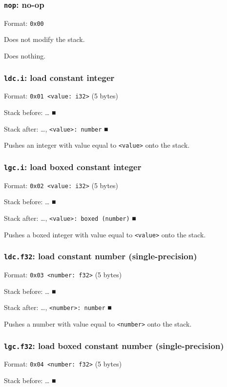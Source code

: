 \documentclass[11pt]{article}
\begin{document}
\subsubsection{\texttt{nop}: no-op}
\label{sec:orgbc7ec8d}
Format: \texttt{0x00}

Does not modify the stack.

Does nothing.

\subsubsection{\texttt{ldc.i}: load constant integer}
\label{sec:orgc756866}
Format: \texttt{0x01 <value: i32>} (5 bytes)

Stack before: \ldots{}​ ■

Stack after: \ldots{}​, \texttt{<value>: number} ■

Pushes an integer with value equal to \texttt{<value>} onto the stack.

\subsubsection{\texttt{lgc.i}: load boxed constant integer}
\label{sec:org5cf9345}
Format: \texttt{0x02 <value: i32>} (5 bytes)

Stack before: \ldots{}​ ■

Stack after: \ldots{}​, \texttt{<value>: boxed (number)} ■

Pushes a boxed integer with value equal to \texttt{<value>} onto the stack.

\subsubsection{\texttt{ldc.f32}: load constant number (single-precision)}
\label{sec:orgd3689f6}
Format: \texttt{0x03 <number: f32>} (5 bytes)

Stack before: \ldots{}​ ■

Stack after: \ldots{}​, \texttt{<number>: number} ■

Pushes a number with value equal to \texttt{<number>} onto the stack.

\subsubsection{\texttt{lgc.f32}: load boxed constant number (single-precision)}
\label{sec:orgee247e4}
Format: \texttt{0x04 <number: f32>} (5 bytes)

Stack before: \ldots{}​ ■
\end{document}
